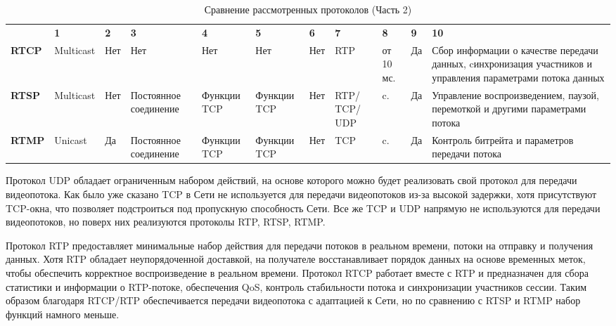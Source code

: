 \begin{table}
	\centering
	\begin{threeparttable}
		\caption{\label{tab:comparison_1} Сравнение рассмотренных протоколов (Часть 2)}
		\begin{tabular}{|>{\centering\arraybackslash}p{2.5cm}|>{\centering\arraybackslash}p{2cm}|>{\centering\arraybackslash}p{1cm}|>{\centering\arraybackslash}p{2.5cm}|>{\centering\arraybackslash}p{2cm}|>{\centering\arraybackslash}p{2cm}|>{\centering\arraybackslash}p{1cm}|>{\centering\arraybackslash}p{1.5cm}|>{\centering\arraybackslash}p{2cm}|>{\centering\arraybackslash}p{1cm}|>{\centering\arraybackslash}p{3.5cm}|}
			\hline
			\multirow{2}{*}{\textbf{Протокол}}& \multicolumn{10}{c|}{\textbf{Номер критерия}} \\ \cline{2-11}
			& \textbf{1}   & \textbf{2} 	   & \textbf{3} & \textbf{4} & \textbf{5} & \textbf{6} & \textbf{7} & \textbf{8} & \textbf{9} & \textbf{10} \\ \hline
			\textbf{RTCP}      & Multicast & Нет & Нет                     & Нет & Нет & Нет & RTP & от 10 мс. & Да & Сбор информации о качестве передачи данных, cинхронизация участников и управления параметрами потока данных \\ \hline
			\textbf{RTSP}  	   & Multicast & Нет & Постоянное соединение & Функции TCP & Функции TCP & Нет & RTP/ TCP/ UDP & 2 c. & Да &  Управление воспроизведением, паузой, перемоткой и другими параметрами потока \\ \hline
			\textbf{RTMP}  	   & Unicast   & Да & Постоянное соединение & Функции TCP & Функции TCP & Нет & TCP & 5 c. & Да & Контроль битрейта и параметров передачи потока \\ \hline
		\end{tabular}
	\end{threeparttable}
\end{table}

\clearpage

Протокол UDP обладает ограниченным набором действий, на основе которого можно будет реализовать свой протокол для передачи видеопотока. Как было уже сказано TCP в Сети не используется для передачи видеопотоков из-за высокой задержки, хотя присутствуют TCP-окна, что позволяет подстроиться под пропускную способность Сети. Все же TCP и UDP напрямую не используются для передачи видеопотоков, но поверх них реализуются протоколы RTP, RTSP, RTMP. 

Протокол RTP предоставляет минимальные набор действия для передачи потоков в реальном времени, потоки на отправку и получения данных. Хотя RTP обладает неупорядоченной доставкой, на получателе восстанавливает порядок данных на основе временных меток, чтобы обеспечить корректное воспроизведение в реальном времени. 
Протокол RTCP работает вместе с RTP и предназначен для сбора статистики и информации о RTP-потоке, обеспечения QoS, контроль стабильности потока и синхронизации участников сессии. Таким образом благодаря RTCP/RTP обеспечивается передачи видеопотока с адаптацией к Сети, но по сравнению с RTSP и RTMP набор функций намного меньше.

